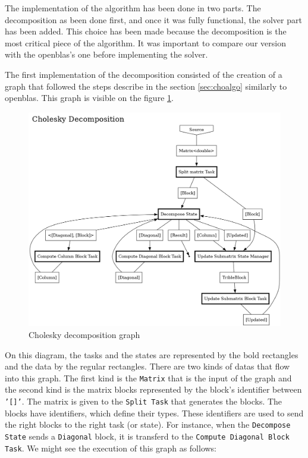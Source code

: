 The implementation of the algorithm has been done in two parts. The
decomposition as been done first, and once it was fully functional, the solver
part has been added. This choice has been made because the decomposition is the
most critical piece of the algorithm. It was important to compare our version
with the openblas's one before implementing the solver.

The first implementation of the decomposition consisted of the creation of a
graph that followed the steps describe in the section \ref{sec:choalgo}
similarly to openblas. This graph is visible on the figure \ref{fig:chograph}.

\begin{figure}[!ht]
  \begin{center}
    \includegraphics[scale=0.3]{img/decompose_graph.png}
    \caption{Cholesky decomposition graph}
    \label{fig:chograph}
  \end{center}
\end{figure}

On this diagram, the tasks and the states are represented by the bold rectangles
and the data by the regular rectangles. There are two kinds of datas that flow
into this graph. The first kind is the \texttt{Matrix} that is the input of the
graph and the second kind is the matrix blocks represented by the block's
identifier between \texttt{'[]'}. The matrix is given to the \texttt{Split Task}
that generates the blocks. The blocks have identifiers, which define their
types. These identifiers are used to send the right blocks to the right task (or
state). For instance, when the \texttt{Decompose State} sends a
\texttt{Diagonal} block, it is transferd to the \texttt{Compute Diagonal Block
Task}. We might see the execution of this graph as follows:

